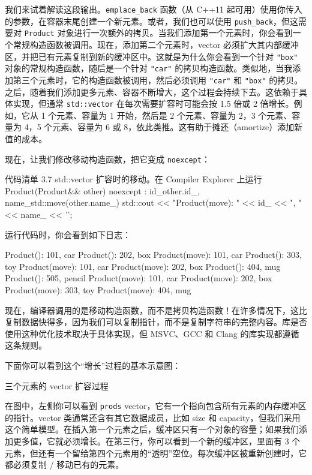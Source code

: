 我们来试着解读这段输出。\texttt{emplace\_back} 函数（从 C++11 起可用）使用你传入的参数，在容器末尾创建一个新元素。或者，我们也可以使用 \texttt{push\_back}，但这需要对 \texttt{Product} 对象进行一次额外的拷贝。当我们添加第一个元素时，你会看到一个常规构造函数被调用。现在，添加第二个元素时，vector 必须扩大其内部缓冲区，并把已有元素复制到新的缓冲区中。这就是为什么你会看到一个针对 \texttt{"box"} 对象的常规构造函数，随后是一个针对 \texttt{"car"} 的拷贝构造函数。类似地，当我添加第三个元素时，它的构造函数被调用，然后必须调用 \texttt{"car"} 和 \texttt{"box"} 的拷贝。之后，随着我们添加更多元素、容器不断增大，这个过程会持续下去。这依赖于具体实现，但通常 \texttt{std::vector} 在每次需要扩容时可能会按 1.5 倍或 2 倍增长。例如，它从 1 个元素、容量为 1 开始，然后是 2 个元素、容量为 2，3 个元素、容量为 4，5 个元素、容量为 6 或 8，依此类推。这有助于摊还（amortize）添加新值的成本。

现在，让我们修改移动构造函数，把它变成 \texttt{noexcept}：

\begin{codeboxt}[cpp]{代码清单 3.7 std::vector 扩容时的移动。在 Compiler Explorer 上运行}
Product(Product&& other) noexcept
: id_{other.id_}, name_{std::move(other.name_)} {
std::cout << "Product(move): " << id_ << ", " << name_ << '\n';
}
\end{codeboxt}

运行代码时，你会看到如下日志：

\begin{codebox}[cpp]
Product(): 101, car
Product(): 202, box
Product(move): 101, car
Product(): 303, toy
Product(move): 101, car
Product(move): 202, box
Product(): 404, mug
Product(): 505, pencil
Product(move): 101, car
Product(move): 202, box
Product(move): 303, toy
Product(move): 404, mug
\end{codebox}

现在，编译器调用的是移动构造函数，而不是拷贝构造函数！在许多情况下，这比复制数据快得多，因为我们可以复制指针，而不是复制字符串的完整内容。库是否使用这种优化技术取决于具体实现，但 MSVC、GCC 和 Clang 的库实现都遵循这条规则。

下面你可以看到这个“增长”过程的基本示意图：

三个元素的 vector 扩容过程

在图中，左侧你可以看到 \texttt{prods} vector，它有一个指向包含所有元素的内存缓冲区的指针。vector 类通常还含有其它数据成员，比如 size 和 capacity，但我们采用这个简单模型。在插入第一个元素之后，缓冲区只有一个对象的容量；如果我们添加更多值，它就必须增长。在第三行，你可以看到一个新的缓冲区，里面有 3 个元素，但还有一个留给第四个元素用的“透明”空位。每次缓冲区被重新创建时，它都必须复制 / 移动已有的元素。

